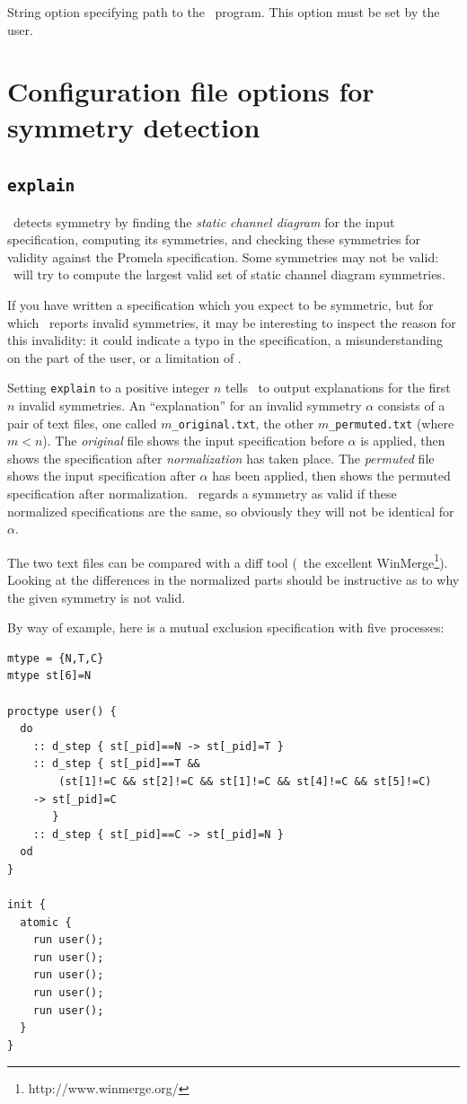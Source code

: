 String option specifying path to the \gap\ program.  This option must be set by the user.

\section{Configuration file options for symmetry detection}


\subsection{\texttt{explain}}

\topspin\ detects symmetry by finding the \emph{static channel diagram} for the input specification, computing its symmetries, and checking these
symmetries for validity against the Promela specification.  Some symmetries may not be valid: \topspin\ will try to compute the largest valid set
of static channel diagram symmetries.

If you have written a specification which you expect to be symmetric, but for which \topspin\ reports invalid symmetries, it may be interesting
to inspect the reason for this invalidity: it could indicate a typo in the specification, a misunderstanding on the part of the user, or a limitation
of \topspin.

Setting \texttt{explain} to a positive integer $n$ tells \topspin\ to output explanations for the first $n$ invalid symmetries.  An ``explanation''
for an invalid symmetry $\alpha$ consists of a pair of text files, one called \texttt{$m$\_original.txt}, the
other \texttt{$m$\_permuted.txt} (where $m<n$).  The \emph{original}
file shows the input specification before $\alpha$ is applied, then shows the specification after \emph{normalization} has taken place.  The
\emph{permuted} file shows the input specification after $\alpha$ has been applied, then shows the permuted specification after normalization.
\topspin\ regards a symmetry as valid if these normalized specifications are the same, so obviously they will not be identical for $\alpha$.

The two text files can be compared with a diff tool (\eg\ the excellent WinMerge\footnote{http://www.winmerge.org/}).  Looking at the differences
in the normalized parts should be instructive as to why the given symmetry is not valid.

By way of example, here is a mutual exclusion specification with five processes:

\begin{lstlisting}
mtype = {N,T,C}
mtype st[6]=N

proctype user() {
  do
    :: d_step { st[_pid]==N -> st[_pid]=T }
    :: d_step { st[_pid]==T &&
        (st[1]!=C && st[2]!=C && st[1]!=C && st[4]!=C && st[5]!=C)
    -> st[_pid]=C
       }
    :: d_step { st[_pid]==C -> st[_pid]=N }
  od
}

init {
  atomic {
    run user();
    run user();
    run user();
    run user();
    run user();
  }
}
\end{lstlisting}

